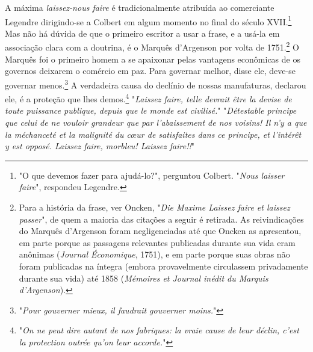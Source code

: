 \documentclass[12pt]{article}
\begin{document}
A máxima \textit{laissez-nous faire} é tradicionalmente atribuída ao comerciante Legendre dirigindo-se a Colbert em algum momento no final do século XVII.\footnote{"O que devemos fazer para ajudá-lo?", perguntou Colbert. "\textit{Nous laisser faire}", respondeu Legendre.} Mas não há dúvida de que o primeiro escritor a usar a frase, e a usá-la em associação clara com a doutrina, é o Marquês d'Argenson por volta de 1751.\footnote{Para a história da frase, ver Oncken, "\textit{Die Maxime Laissez faire et laissez passer}", de quem a maioria das citações a seguir é retirada. As reivindicações do Marquês d'Argenson foram negligenciadas até que Oncken as apresentou, em parte porque as passagens relevantes publicadas durante sua vida eram anônimas (\textit{Journal Économique}, 1751), e em parte porque suas obras não foram publicadas na íntegra (embora provavelmente circulassem privadamente durante sua vida) até 1858 (\textit{Mémoires et Journal inédit du Marquis d'Argenson}).} O Marquês foi o primeiro homem a se apaixonar pelas vantagens econômicas de os governos deixarem o comércio em paz. Para governar melhor, disse ele, deve-se governar menos.\footnote{"\textit{Pour gouverner mieux, il faudrait gouverner moins.}"} A verdadeira causa do declínio de nossas manufaturas, declarou ele, é a proteção que lhes demos.\footnote{"\textit{On ne peut dire autant de nos fabriques: la vraie cause de leur déclin, c'est la protection outrée qu'on leur accorde.}"} "\textit{Laissez faire, telle devrait être la devise de toute puissance publique, depuis que le monde est civilisé.}" "\textit{Détestable principe que celui de ne vouloir grandeur que par l'abaissement de nos voisins! Il n'y a que la méchanceté et la malignité du cœur de satisfaites dans ce principe, et l'intérêt y est opposé. Laissez faire, morbleu! Laissez faire!!}"
\end{document}
